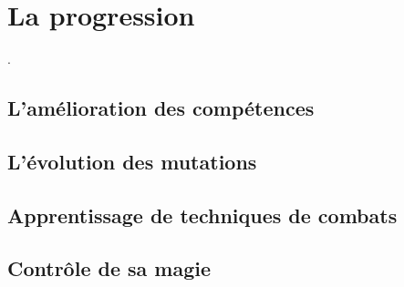 \chapter{La progression}.

\section{L'amélioration des compétences}

\section{L'évolution des mutations}

\section{Apprentissage de techniques de combats}

\section{Contrôle de sa magie}